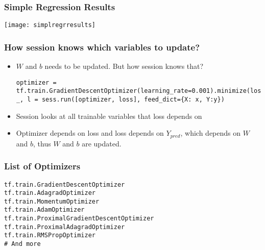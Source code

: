 \begin{frame}[fragile] \frametitle{Simple Regression Results}
\begin{center}
\texttt{[image: simplregrresults]}
\end{center}
\end{frame}



\begin{frame}[fragile] \frametitle{How session knows which variables to update?}
\begin{itemize}
\item $W$ and $b$ needs to be updated. But how session knows that?
\begin{lstlisting}
optimizer = tf.train.GradientDescentOptimizer(learning_rate=0.001).minimize(loss)
_, l = sess.run([optimizer, loss], feed_dict={X: x, Y:y})
\end{lstlisting}
\item Session looks at all trainable variables that loss depends on
\item Optimizer depends on loss and loss depends on $Y_{pred}$, which depends on $W$ and $b$, thus $W$ and $b$ are updated.
\end{itemize}

\end{frame}



\begin{frame}[fragile] \frametitle{List of Optimizers}
\begin{lstlisting}
tf.train.GradientDescentOptimizer
tf.train.AdagradOptimizer
tf.train.MomentumOptimizer
tf.train.AdamOptimizer
tf.train.ProximalGradientDescentOptimizer
tf.train.ProximalAdagradOptimizer
tf.train.RMSPropOptimizer
# And more
\end{lstlisting}
\end{frame}



